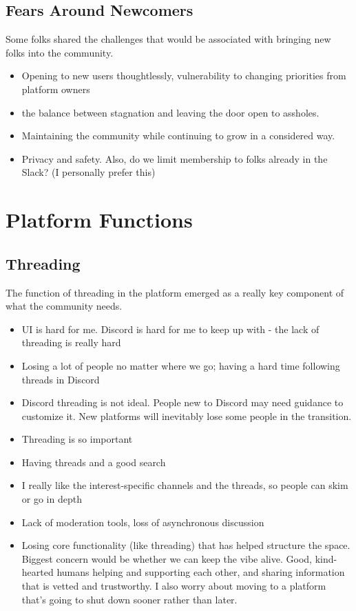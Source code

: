 \documentclass[
]{book}
\providecommand{\tightlist}{%
  \setlength{\itemsep}{0pt}\setlength{\parskip}{0pt}}
\begin{document}
\subsection{Fears Around Newcomers}\label{fears-around-newcomers}

Some folks shared the challenges that would be associated with bringing new folks into the community.

\begin{itemize}
\tightlist
\item
  Opening to new users thoughtlessly, vulnerability to changing priorities from platform owners
\item
  the balance between stagnation and leaving the door open to assholes.
\item
  Maintaining the community while continuing to grow in a considered way.
\item
  Privacy and safety. Also, do we limit membership to folks already in the Slack? (I personally prefer this)
\end{itemize}

\section{Platform Functions}\label{platform-functions}

\subsection{Threading}\label{threading}

The function of threading in the platform emerged as a really key component of what the community needs.

\begin{itemize}
\tightlist
\item
  UI is hard for me. Discord is hard for me to keep up with - the lack of threading is really hard
\item
  Losing a lot of people no matter where we go; having a hard time following threads in Discord
\item
  Discord threading is not ideal. People new to Discord may need guidance to customize it. New platforms will inevitably lose some people in the transition.
\item
  Threading is so important
\item
  Having threads and a good search
\item
  I really like the interest-specific channels and the threads, so people can skim or go in depth
\item
  Lack of moderation tools, loss of asynchronous discussion
\item
  Losing core functionality (like threading) that has helped structure the space. Biggest concern would be whether we can keep the vibe alive. Good, kind-hearted humans helping and supporting each other, and sharing information that is vetted and trustworthy. I also worry about moving to a platform that's going to shut down sooner rather than later.
\end{itemize}
\end{document}

